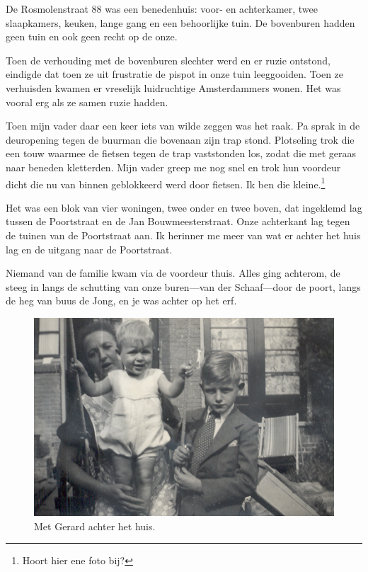 \documentclass[12pt,twoside, openright]{memoir}
\begin{document}
De Rosmolenstraat 88 was een benedenhuis: voor- en achterkamer, twee slaapkamers, keuken, lange gang en een behoorlijke tuin. De bovenburen hadden geen tuin en ook geen recht op de onze. 

Toen de verhouding met de bovenburen slechter werd en er ruzie ontstond, eindigde dat toen ze uit frustratie de pispot in onze tuin leeggooiden. Toen ze verhuisden kwamen er vreselijk luidruchtige Amsterdammers wonen. Het was vooral erg als ze samen ruzie hadden. 

Toen mijn vader daar een keer iets van wilde zeggen was het raak. Pa sprak in de deuropening tegen de buurman die bovenaan zijn trap stond. Plotseling trok die een touw waarmee de fietsen tegen de trap vaststonden los, zodat die met geraas naar beneden kletterden. Mijn vader greep me nog snel en trok hun voordeur dicht die nu van binnen geblokkeerd werd door fietsen. Ik ben die kleine.\footnote{Hoort hier ene foto bij?}

Het was een blok van vier woningen, twee onder en twee boven, dat ingeklemd lag tussen de Poortstraat en de Jan Bouwmeesterstraat. Onze achterkant lag tegen de tuinen van de Poortstraat aan. Ik herinner me meer van wat er achter het huis lag en de uitgang naar de Poortstraat. 

Niemand van de familie kwam via de voordeur thuis. Alles ging achterom, de steeg in langs de schutting van onze buren---van der Schaaf---door de poort, langs de heg van buus de Jong, en je was achter op het erf. 

\begin{figure}
\includegraphics[width=\textwidth]{img/ch5/Rosmstraat3}
\caption*{\footnotesize Met Gerard achter het huis.}
\end{figure}
\end{document}
